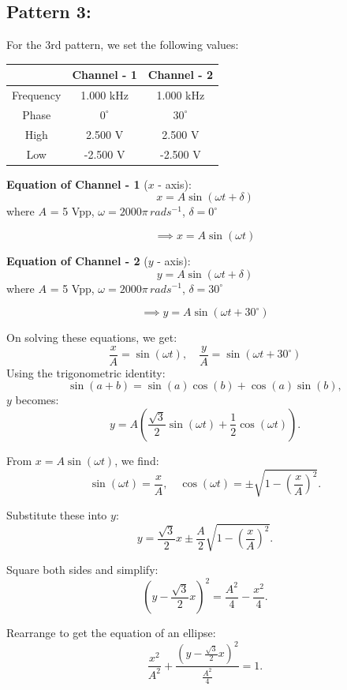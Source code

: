 \documentclass[12pt]{article}
\begin{document}
\subsection{Pattern 3:}
For the 3rd pattern, we set the following values:
\begin{table}[H]
    \centering
    \begin{tabular}{|c|c|c|}
    \hline
        & \textbf{Channel - 1} & \textbf{Channel - 2}\\
    \hline
    Frequency & 1.000 kHz & 1.000 kHz\\
    \hline
    Phase     & $0^{\circ}$ & $30^{\circ}$\\
    \hline
    High      & 2.500 V & 2.500 V\\
    \hline
    Low       & -2.500 V & -2.500 V\\
    \hline
    \end{tabular}
\end{table}

\textbf{Equation of Channel - 1} ($x$ - axis):
\[
x = A \sin{\left(\omega t + \delta\right)}
\]
where $A$ = 5 Vpp, $\omega = 2000 \pi \, rad s^{-1}$, $\delta = 0^{\circ}$

\[
\implies x = A \sin{\left(\omega t\right)}
\]

\textbf{Equation of Channel - 2} ($y$ - axis):
\[
y = A \sin{\left(\omega t + \delta\right)}
\]
where $A$ = 5 Vpp, $\omega = 2000 \pi \, rad s^{-1}$, $\delta = 30^{\circ}$

\[
\implies y = A \sin{\left(\omega t + 30^\circ\right)}
\]

On solving these equations, we get:
\[
\frac{x}{A} = \sin{\left(\omega t\right)}, \quad \frac{y}{A} = \sin{\left(\omega t + 30^\circ\right)}
\]
Using the trigonometric identity:
\[
\sin(a + b) = \sin(a)\cos(b) + \cos(a)\sin(b),
\]
\(y\) becomes:
\[
y = A \left( \frac{\sqrt{3}}{2} \sin(\omega t) + \frac{1}{2} \cos(\omega t) \right).
\]

From \(x = A \sin(\omega t)\), we find:
\[
\sin(\omega t) = \frac{x}{A}, \quad \cos(\omega t) = \pm \sqrt{1 - \left(\frac{x}{A}\right)^2}.
\]

Substitute these into \(y\):
\[
y = \frac{\sqrt{3}}{2}x \pm \frac{A}{2} \sqrt{1 - \left(\frac{x}{A}\right)^2}.
\]

Square both sides and simplify:
\[
\left(y - \frac{\sqrt{3}}{2}x\right)^2 = \frac{A^2}{4} - \frac{x^2}{4}.
\]

Rearrange to get the equation of an ellipse:
\[
\frac{x^2}{A^2} + \frac{\left(y - \frac{\sqrt{3}}{2}x\right)^2}{\frac{A^2}{4}} = 1.
\]
\end{document}
